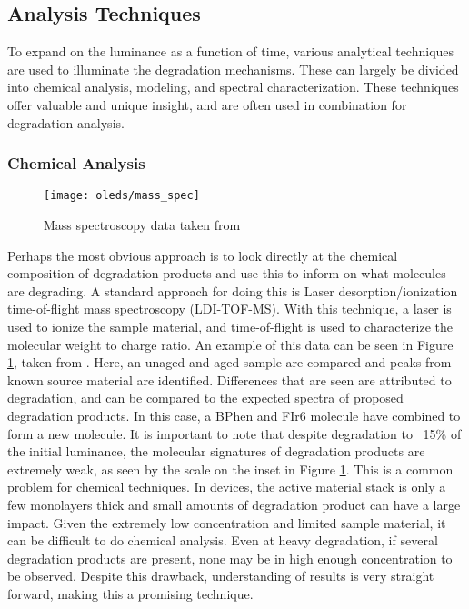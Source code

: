 \documentclass[../thesis.tex]{subfiles}
\begin{document}
\subsection{Analysis Techniques}\label{sec:degradation_analysis}

To expand on the luminance as a function of time, various analytical techniques are used to illuminate the degradation mechanisms.
These can largely be divided into chemical analysis, modeling, and spectral characterization.
These techniques offer valuable and unique insight, and are often used in combination for degradation analysis.

\subsubsection{Chemical Analysis}

\begin{figure}[ht]
\centering
\texttt{[image: oleds/mass\_spec]}
\caption{Mass spectroscopy data taken from \textcite{Seifert2013b}}
\label{fig:oleds_mass_spec}
\end{figure}

Perhaps the most obvious approach is to look directly at the chemical composition of degradation products and use this to inform on what molecules are degrading.
A standard approach for doing this is Laser desorption/ionization time-of-flight mass spectroscopy (LDI-TOF-MS).\supercite{Moraes2011,DeMoraes2011,Seifert2013b}
With this technique, a laser is used to ionize the sample material, and time-of-flight is used to characterize the molecular weight to charge ratio.  
An example of this data can be seen in Figure \ref{fig:oleds_mass_spec}, taken from \textcite{Seifert2013b}.
Here, an unaged and aged sample are compared and peaks from known source material are identified.
Differences that are seen are attributed to degradation, and can be compared to the expected spectra of proposed degradation products.
In this case, a BPhen and FIr6 molecule have combined to form a new molecule.
It is important to note that despite degradation to ~15\% of the initial luminance, the molecular signatures of degradation products are extremely weak, as seen by the scale on the inset in Figure \ref{fig:oleds_mass_spec}.
This is a common problem for chemical techniques.
In devices, the active material stack is only a few monolayers thick and small amounts of degradation product can have a large impact.
Given the extremely low concentration and limited sample material, it can be difficult to do chemical analysis.
Even at heavy degradation, if several degradation products are present, none may be in high enough concentration to be observed.
Despite this drawback, understanding of results is very straight forward, making this a promising technique.
\end{document}
